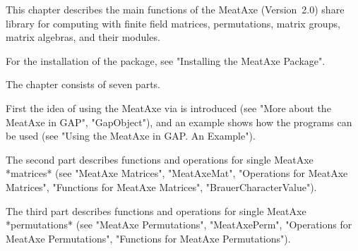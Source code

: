 \def\MeatAxe{\sf MeatAxe}

This chapter describes the main functions  of the {\MeatAxe}  (Version~2.0)
share library  for  computing  with  finite field matrices, permutations,
matrix groups, matrix algebras, and their modules.

For the installation of the package, see "Installing the MeatAxe Package".

The chapter consists of seven parts.

First the idea of using the {\MeatAxe} via {\GAP} is introduced
(see "More about the MeatAxe in GAP", "GapObject"), and an example shows
how the programs can be used (see "Using the MeatAxe in GAP. An Example").

The second part describes functions and operations for single {\MeatAxe}
*matrices* (see "MeatAxe Matrices", "MeatAxeMat", "Operations for MeatAxe
Matrices", "Functions for MeatAxe Matrices", "BrauerCharacterValue").

The third part describes functions and operations for single {\MeatAxe}
*permutations* (see "MeatAxe Permutations", "MeatAxePerm", "Operations for
MeatAxe Permutations", "Functions for MeatAxe Permutations").

